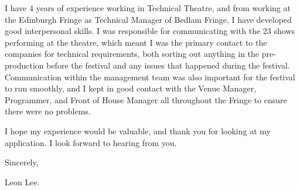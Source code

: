 \documentclass[11pt,english]{article}
\begin{document}
\medskip


I have 4 years of experience working in Technical Theatre, and from working at the Edinburgh Fringe as Technical Manager of Bedlam Fringe, I have developed good interpersonal skills. I was responsible for communicating with the 23 shows performing at the theatre, which meant I was the primary contact to the companies for technical requirements, both sorting out anything in the pre-production before the festival and any issues that happened during the festival. Communication within the management team was also important for the festival to run smoothly, and I kept in good contact with the Venue Manager, Programmer, and Front of House Manager all throughout the Fringe to ensure there were no problems. 

\medskip

I hope my experience would be valuable, and thank you for looking at my application. I look forward to hearing from you.

\medskip
Sincerely,

Leon Lee.
\end{document}
